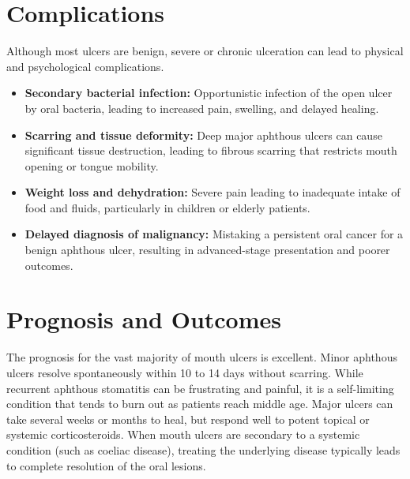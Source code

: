 \section*{Complications}
Although most ulcers are benign, severe or chronic ulceration can lead to physical and psychological complications.
\begin{itemize}
    \item \textbf{Secondary bacterial infection:} Opportunistic infection of the open ulcer by oral bacteria, leading to increased pain, swelling, and delayed healing.
    \item \textbf{Scarring and tissue deformity:} Deep major aphthous ulcers can cause significant tissue destruction, leading to fibrous scarring that restricts mouth opening or tongue mobility.
    \item \textbf{Weight loss and dehydration:} Severe pain leading to inadequate intake of food and fluids, particularly in children or elderly patients.
    \item \textbf{Delayed diagnosis of malignancy:} Mistaking a persistent oral cancer for a benign aphthous ulcer, resulting in advanced-stage presentation and poorer outcomes.
\end{itemize}

\section*{Prognosis and Outcomes}
The prognosis for the vast majority of mouth ulcers is excellent. Minor aphthous ulcers resolve spontaneously within 10 to 14 days without scarring. While recurrent aphthous stomatitis can be frustrating and painful, it is a self-limiting condition that tends to burn out as patients reach middle age. Major ulcers can take several weeks or months to heal, but respond well to potent topical or systemic corticosteroids. When mouth ulcers are secondary to a systemic condition (such as coeliac disease), treating the underlying disease typically leads to complete resolution of the oral lesions.

